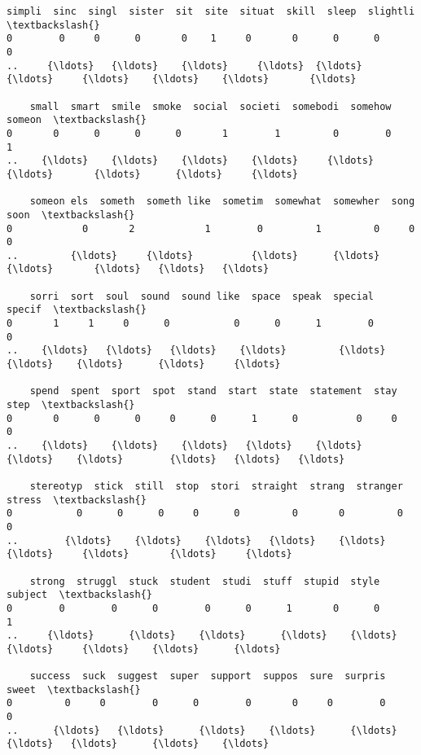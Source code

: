 \documentclass[11pt]{article}
\begin{document}
\begin{Verbatim}[commandchars=\\\{\}]
    simpli  sinc  singl  sister  sit  site  situat  skill  sleep  slightli  \textbackslash{}
0        0     0      0       0    1     0       0      0      0         0   
..     {\ldots}   {\ldots}    {\ldots}     {\ldots}  {\ldots}   {\ldots}     {\ldots}    {\ldots}    {\ldots}       {\ldots}   

    small  smart  smile  smoke  social  societi  somebodi  somehow  someon  \textbackslash{}
0       0      0      0      0       1        1         0        0       1   
..    {\ldots}    {\ldots}    {\ldots}    {\ldots}     {\ldots}      {\ldots}       {\ldots}      {\ldots}     {\ldots}   

    someon els  someth  someth like  sometim  somewhat  somewher  song  soon  \textbackslash{}
0            0       2            1        0         1         0     0     0   
..         {\ldots}     {\ldots}          {\ldots}      {\ldots}       {\ldots}       {\ldots}   {\ldots}   {\ldots}   

    sorri  sort  soul  sound  sound like  space  speak  special  specif  \textbackslash{}
0       1     1     0      0           0      0      1        0       0   
..    {\ldots}   {\ldots}   {\ldots}    {\ldots}         {\ldots}    {\ldots}    {\ldots}      {\ldots}     {\ldots}   

    spend  spent  sport  spot  stand  start  state  statement  stay  step  \textbackslash{}
0       0      0      0     0      0      1      0          0     0     0   
..    {\ldots}    {\ldots}    {\ldots}   {\ldots}    {\ldots}    {\ldots}    {\ldots}        {\ldots}   {\ldots}   {\ldots}   

    stereotyp  stick  still  stop  stori  straight  strang  stranger  stress  \textbackslash{}
0           0      0      0     0      0         0       0         0       0   
..        {\ldots}    {\ldots}    {\ldots}   {\ldots}    {\ldots}       {\ldots}     {\ldots}       {\ldots}     {\ldots}   

    strong  struggl  stuck  student  studi  stuff  stupid  style  subject  \textbackslash{}
0        0        0      0        0      0      1       0      0        1   
..     {\ldots}      {\ldots}    {\ldots}      {\ldots}    {\ldots}    {\ldots}     {\ldots}    {\ldots}      {\ldots}   

    success  suck  suggest  super  support  suppos  sure  surpris  sweet  \textbackslash{}
0         0     0        0      0        0       0     0        0      0   
..      {\ldots}   {\ldots}      {\ldots}    {\ldots}      {\ldots}     {\ldots}   {\ldots}      {\ldots}    {\ldots}   


\end{Verbatim}
\end{document}
